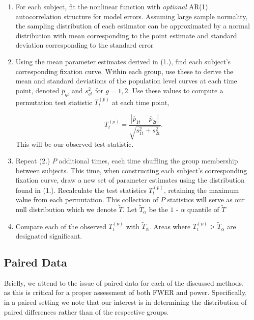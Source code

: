 \documentclass{article}
\begin{document}
\begin{enumerate}
\vspace{-2mm}
\item For each subject, fit the nonlinear function with \textit{optional} AR(1) autocorrelation structure for model errors. Assuming large sample normality, the sampling distribution of each estimator can be approximated by a normal distribution with mean corresponding to the point estimate and standard deviation corresponding to the standard error
\item Using the mean parameter estimates derived in (1.), find each subject's corresponding fixation curve. Within each group, use these to derive the mean and standard deviations of the population level curves at each time point, denoted $\overline{p}_{gt}$ and $s_{gt}^2$ for $g = 1,2$. Use these values to compute a permutation test statistic $T_t^{(p)}$ at each time point,

\begin{equation}
T_t^{(p)} = \frac{|\overline{p}_{1t} - \overline{p}_{2t}|}{\sqrt{s_{1t}^2 + s_{2t}^2}}.
\end{equation}
This will be our observed test statistic.
\item Repeat (2.) $P$  additional times, each time shuffling the group membership between subjects. This time, when constructing each subject's corresponding fixation curve, draw a new set of parameter estimates using the distribution found in (1.). Recalculate the test statistics $T_t^{(p)}$, retaining the maximum value from each permutation. This collection of $P$ statistics will serve as our null distribution which we denote $\widetilde{T}$. Let $\widetilde{T}_{\alpha}$ be the $1$ - $\alpha$ quantile of $\widetilde{T}$
\item Compare each of the observed $T_t^{(p)}$ with $\widetilde{T}_{\alpha}$. Areas where $T_t^{(p)} > \widetilde{T}_{\alpha}$ are designated significant. 
\end{enumerate}



\subsection{Paired Data}

Briefly, we attend to the issue of paired data for each of the discussed methods, as this is critical for a proper assessment of both FWER and power. Specifically, in a paired setting we note that our interest is in determining the distribution of paired differences rather than of the respective groups. 
\end{document}

